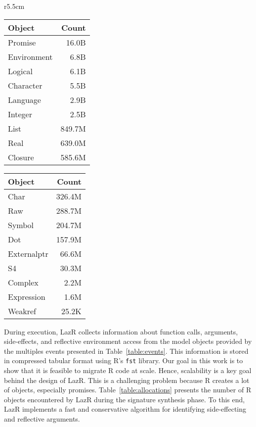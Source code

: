 \documentclass[review,nonacm,screen,acmsmall,anonymous=true]{acmart}
\renewcommand{\c}[1]{\lstinline |#1|\xspace}
\newcommand{\lazr}{{\sf LazR}\xspace}
\begin{document}
\begin{wraptable}{r}{5.5cm}
  \vspace{-3mm}
  \small
  \caption{Allocations} \label{table:allocations}
  \centering
  \begin{tabular}{lr}
    \toprule
    \bf Object&\bf Count\\
    \midrule
    Promise&16.0B\\
    Environment&6.8B\\
    Logical&6.1B\\
    Character&5.5B\\
    Language&2.9B\\
    Integer&2.5B\\
    List&849.7M\\
    Real&639.0M\\
    Closure&585.6M\\
    \bottomrule
  \end{tabular}
  \begin{tabular}{lr}
    \toprule
    \bf Object&\bf Count\\
    \midrule
    Char&326.4M\\
    Raw&288.7M\\
    Symbol&204.7M\\
    Dot&157.9M\\
    Externalptr&66.6M\\
    S4&30.3M\\
    Complex&2.2M\\
    Expression&1.6M\\
    Weakref&25.2K\\
    \bottomrule
  \end{tabular}
\end{wraptable}

During execution, \lazr collects information about function calls, arguments,
side-effects, and reflective environment access from the model objects provided
by the multiples events presented in Table~\ref{table:events}. This information
is stored in compressed tabular format using R's \c{fst} library.
Our goal in this work is to show that it is feasible to migrate R code at scale.
Hence, scalability is a key goal behind the design of \lazr. This is a
challenging problem because R creates a lot of objects, especially promises.
Table~\ref{table:allocations} presents the number of R objects encountered by
\lazr during the signature synthesis phase. To this end, \lazr implements a fast
and conservative algorithm for identifying side-effecting and reflective
arguments.
\end{document}
